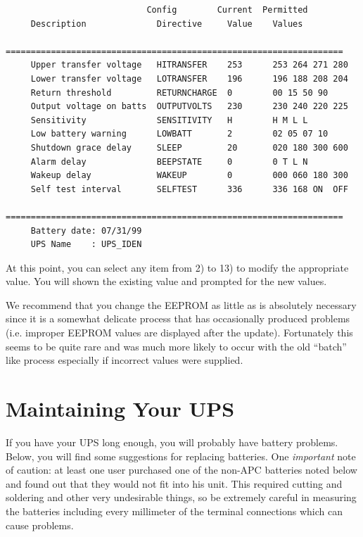 {{{{{{{{\begin{verbatim}
                            Config        Current  Permitted
     Description              Directive     Value    Values
     ===================================================================
     Upper transfer voltage   HITRANSFER    253      253 264 271 280
     Lower transfer voltage   LOTRANSFER    196      196 188 208 204
     Return threshold         RETURNCHARGE  0        00 15 50 90
     Output voltage on batts  OUTPUTVOLTS   230      230 240 220 225
     Sensitivity              SENSITIVITY   H        H M L L
     Low battery warning      LOWBATT       2        02 05 07 10
     Shutdown grace delay     SLEEP         20       020 180 300 600
     Alarm delay              BEEPSTATE     0        0 T L N
     Wakeup delay             WAKEUP        0        000 060 180 300
     Self test interval       SELFTEST      336      336 168 ON  OFF
     ===================================================================
     Battery date: 07/31/99
     UPS Name    : UPS_IDEN
\end{verbatim}
\normalsize

At this point, you can select any item from 2) to 13) to modify the
appropriate value. You will shown the existing value and prompted for the new
values.  

We recommend that you change the EEPROM as little as is absolutely necessary
since it is a somewhat delicate process that has occasionally produced
problems (i.e. improper EEPROM values are displayed after the update).
Fortunately this seems to be quite rare and was much more likely to occur with
the old ``batch'' like process especially if incorrect values were supplied. 

\label{Maintaining-Your-UPS}

\section*{Maintaining Your UPS}

\label{index-Maintenance-144}
If you have your UPS long enough, you will probably have battery problems.
Below, you will find some suggestions for replacing batteries. One {\it
important} note of caution: at least one user purchased one of the non-APC
batteries noted below and found out that they would not fit into his unit.
This required cutting and soldering and other very undesirable things, so be
extremely careful in measuring the batteries including every millimeter of the
terminal connections which can cause problems.  

}}}}}}}}
